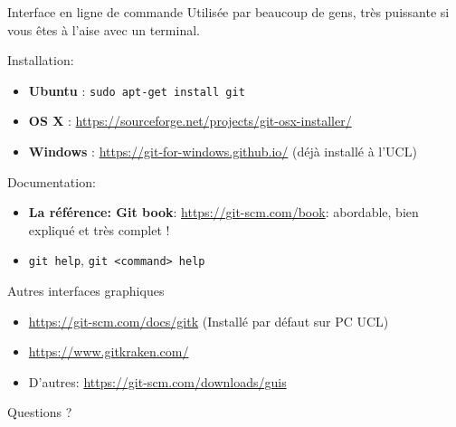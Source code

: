 \documentclass{beamer}
\begin{document}
\begin{frame}{Interface en ligne de commande}
    Utilisée par beaucoup de gens, très puissante si vous êtes à l'aise avec
    un terminal.

    Installation:
    \begin{itemize}
        \item \textbf{Ubuntu} : \texttt{sudo apt-get install git}
        \item \textbf{OS X} : \url{https://sourceforge.net/projects/git-osx-installer/}
        \item \textbf{Windows} : \url{https://git-for-windows.github.io/} (déjà
            installé à l'UCL)
    \end{itemize}

    Documentation:
    \begin{itemize}
        \item \textbf{La référence: Git book}: \url{https://git-scm.com/book}:
            abordable, bien expliqué et très complet !
        \item \texttt{git help}, \texttt{git <command> help}
    \end{itemize}
\end{frame}

\begin{frame}{Autres interfaces graphiques}
    \begin{itemize}
        \item \url{https://git-scm.com/docs/gitk} (Installé par défaut sur PC UCL)
        \item \url{https://www.gitkraken.com/}
        \item D'autres: \url{https://git-scm.com/downloads/guis}
    \end{itemize}
\end{frame}

\begin{frame}[standout]
    Questions ?
\end{frame}
\end{document}
